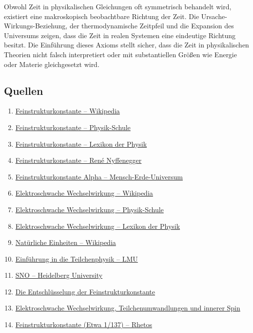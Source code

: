 \documentclass{article}
\begin{document}
	Obwohl Zeit in physikalischen Gleichungen oft symmetrisch behandelt wird, existiert eine makroskopisch beobachtbare Richtung der Zeit. Die Ursache-Wirkungs-Beziehung, der thermodynamische Zeitpfeil und die Expansion des Universums zeigen, dass die Zeit in realen Systemen eine eindeutige Richtung besitzt. Die Einführung dieses Axioms stellt sicher, dass die Zeit in physikalischen Theorien nicht falsch interpretiert oder mit substantiellen Größen wie Energie oder Materie gleichgesetzt wird.
	
	\subsection*{Quellen}
	\begin{enumerate}
		\item \href{https://de.wikipedia.org/wiki/Feinstrukturkonstante}{Feinstrukturkonstante – Wikipedia}
		\item \href{https://www.cosmos-indirekt.de/Physik-Schule/Feinstrukturkonstante}{Feinstrukturkonstante – Physik-Schule}
		\item \href{https://www.spektrum.de/lexikon/physik/feinstrukturkonstante/4829}{Feinstrukturkonstante – Lexikon der Physik}
		\item \href{https://renenyffenegger.ch/notes/Wissenschaft/Physik/Konstanten/Feinstrukturkonstante}{Feinstrukturkonstante – René Nyffenegger}
		\item \href{https://mensch-erde-universum.de/feinstrukturkonstante/}{Feinstrukturkonstante Alpha – Mensch-Erde-Universum}
		\item \href{https://de.wikipedia.org/wiki/Elektroschwache_Wechselwirkung}{Elektroschwache Wechselwirkung – Wikipedia}
		\item \href{https://www.cosmos-indirekt.de/Physik-Schule/Elektroschwache_Wechselwirkung}{Elektroschwache Wechselwirkung – Physik-Schule}
		\item \href{https://www.spektrum.de/lexikon/physik/elektroschwache-wechselwirkung/4197}{Elektroschwache Wechselwirkung – Lexikon der Physik}
		\item \href{https://de.wikipedia.org/wiki/Nat%C3%BCrliche_Einheiten}{Natürliche Einheiten – Wikipedia}
		\item \href{https://www-static.etp.physik.uni-muenchen.de/fp-versuch/node5.html}{Einführung in die Teilchenphysik – LMU}
		\item \href{https://www.thphys.uni-heidelberg.de/~wolschin/alpha.html}{SNO – Heidelberg University}
		\item \href{https://vixra.org/pdf/1408.0018vM.pdf}{Die Entschlüsselung der Feinstrukturkonstante}
		\item \href{https://nsosp.org/de/Quanten-Fluss-Theorie/Elektroschwache-Wechselwirkung-Teilchenumwandlungen-schwacher-Isospin_de.php}{Elektroschwache Wechselwirkung, Teilchenumwandlungen und innerer Spin}
		\item \href{https://www.rhetos.de/html/lex/feinstrukturkonstante.htm}{Feinstrukturkonstante (Etwa 1/137) – Rhetos}
	\end{enumerate}
	
	
	
\end{document}
